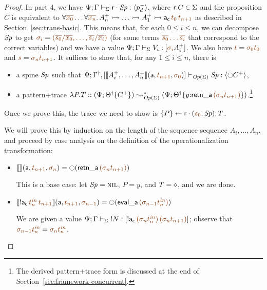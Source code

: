 \begin{proof}
In part 4, we have ${\Psi}; {\Gamma} \vdash_{\Sigma} {{\sf
    r} \cdot {{\it Sp}}} : {\langle {p^-_d} \rangle}$, where ${\sf r}{:}C \in \Sigma$ and the
proposition $C$ is equivalent to
$\forall\lf{\overline{x_0}}\ldots\forall\lf{\overline{x_n}}.\, A^+_n \lefti
\ldots \lefti A^+_1 \lefti {\sf a_c}\,\lf{t_0}\,\lf{t_{n+1}}$ as described in
Section~\ref{sec:trans-basic}. This means that, for each $0 \leq
i \leq n$, we can decompose ${\it Sp}$ to
get $\lf{\sigma_i} = \lf{(\overline{s_0}/\overline{x_0},\ldots,
\overline{s_i}/\overline{x_i})}$ (for some terms $\lf{\overline{s_0} \ldots
\overline{s_i}}$ that correspond to the correct variables) and 
we have a value
$\slst{\Sigma}{\Psi}{\Gamma}{V_i}{[\lf{\sigma_i}{A^+_i}]}$. 
We also have $\lf{t} = \lf{\sigma_0{t_0}}$ and $\lf{s} = \lf{\sigma_n{t_{n+1}}}$.
It suffices to show that, for any $1 \leq i \leq n$, 
there is
\smallskip
\begin{itemize}
\item a spine ${\it Sp}$ such that 
$\slst{\transop\Sigma}{\Psi}{\opsubst{\Gamma},[
\opbasic{A_i^+, \ldots, A_n^+}{t_{n+1}}{\sigma_0}
]}{\Sp}{\susp{{\ocircle}C^+}}$,
\item a pattern+trace $\lambda P.T :: (\Psi; \tackon{\opsubst{\Theta}}{C^+}) 
\leadsto^*_{\transop{\Sigma}}
 (\Psi; \tackon{\opsubst{\Theta}}{y{:}{\sf retn\_a}\,\lf{({\sigma_n}t_{n+1})}})$.\footnote{The derived pattern+trace form is discussed at the end of Section~\ref{sec:framework-concurrent}.}
\end{itemize}
\smallskip
Once we prove this, the trace we need to show is $\tstep{P}{\sf r}{(\lf{s_0};\Sp)}; T$.

We will prove this
by induction on the length of the sequence sequence $A_i,\ldots,A_n$, and
proceed
by case analysis on the definition of the operationalization transformation:
\smallskip
\begin{itemize}
\item $\opbasic{}{t_{n+1}}{\sigma_n} = {\ocircle}({\sf retn\_a}\,\lf{(\sigma_{n}{t_{n+1}})})$

  \bigskip
  This is a base case: 
  let ${\it Sp} = \textsc{nil}$, $P = y$, and $T = \diamond$, and 
  we are done.
  \bigskip

\item $\opbasic{{!}{\sf a_c}\,\lf{t^{\it in}_n}\,\lf{t_{n+1}}}{t_{n+1}}{\lf{\sigma_{n-1}}} 
  = {\ocircle}({\sf eval\_a}\,\lf{(\sigma_{n-1}{t^{\it in}_n})})$

  \bigskip
  We are given a value 
  $\slst{\Sigma}{\Psi}{\Gamma}{\tbangr{N}}
   {[{\bang}{\sf a_c}\,\lf{(\sigma_n{t^{\it in}_n})}\,\lf{(\sigma_n{t_{n+1}})}]}$;
  observe that $\lf{\sigma_{n-1}{t_n^{\it in}}} = \lf{\sigma_n{t_n^{\it in}}}$.


\end{itemize}
\end{proof}
